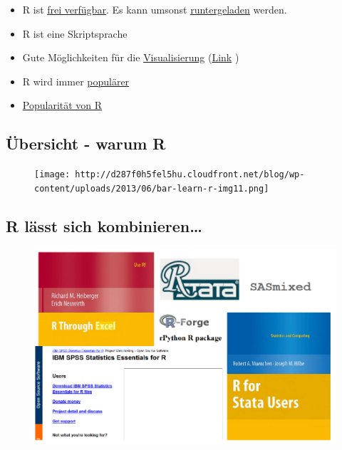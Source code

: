 \documentclass[]{article}
\providecommand{\tightlist}{%
  \setlength{\itemsep}{0pt}\setlength{\parskip}{0pt}}
\begin{document}
\begin{itemize}
\tightlist
\item
  R ist \href{http://www.inside-r.org/why-use-r}{frei verfügbar}. Es
  kann umsonst \href{http://mirrors.softliste.de/cran/}{runtergeladen}
  werden.
\item
  R ist eine Skriptsprache
\item
  Gute Möglichkeiten für die
  \href{http://research.stowers-institute.org/efg/R/}{Visualisierung}
  (\href{http://www.sr.bham.ac.uk/~ajrs/R/r-gallery.html}{Link} )
\item
  R wird immer
  \href{https://twitter.com/josiahjdavis/status/559778930476220418}{populärer}
\item
  \href{http://blog.revolutionanalytics.com/popularity/}{Popularität von
  R}
\end{itemize}

\subsection{Übersicht - warum R}\label{ubersicht---warum-r}

\begin{figure}[htbp]
\centering
\texttt{[image: http://d287f0h5fel5hu.cloudfront.net/blog/wp-content/uploads/2013/06/bar-learn-r-img11.png]}
\caption{}
\end{figure}

\subsection{R lässt sich
kombinieren\ldots{}}\label{r-lasst-sich-kombinieren}

\begin{figure}[htbp]
\centering
\includegraphics{figure/Rinterfaces.PNG}
\caption{}
\end{figure}
\end{document}
